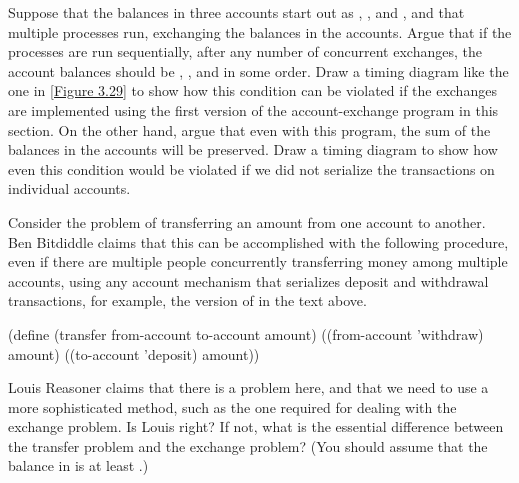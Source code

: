 \begin{exercise}
	\label{Exercise 3.43}
	Suppose that the balances in three accounts start out as , , and , and that multiple processes run, exchanging the balances in the accounts.
	Argue that if the processes are run sequentially, after any number of concurrent exchanges, the account balances should be , , and  in some order.
	Draw a timing diagram like the one in \cref{Figure 3.29} to show how this condition can be violated if the exchanges are implemented using the first version of the account-exchange program in this section.
	On the other hand, argue that even with this  program, the sum of the balances in the accounts will be preserved.
	Draw a timing diagram to show how even this condition would be violated if we did not serialize the transactions on individual accounts.
\end{exercise}



\begin{exercise}
	\label{Exercise 3.44}
	Consider the problem of transferring an amount from one account to another.
	Ben Bitdiddle claims that this can be accomplished with the following procedure, even if there are multiple people concurrently transferring money among multiple accounts, using any account mechanism that serializes deposit and withdrawal transactions, for example, the version of  in the text above.
	\begin{scheme}
	  (define (transfer from-account to-account amount)
	    ((from-account 'withdraw) amount)
	    ((to-account 'deposit) amount))
	\end{scheme}
	Louis Reasoner claims that there is a problem here, and that we need to use a more sophisticated method, such as the one required for dealing with the exchange problem.
	Is Louis right?
	If not, what is the essential difference between the transfer problem and the exchange problem?
	(You should assume that the balance in  is at least .)
\end{exercise}



